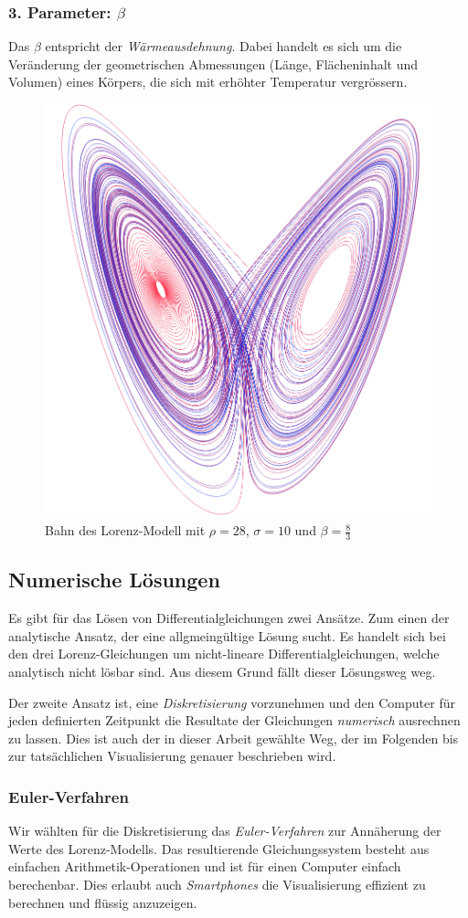\subsubsection{3. Parameter: $\beta$}
Das $ \beta $ entspricht der \textit{Wärmeausdehnung}. Dabei handelt es sich um die Veränderung der geometrischen Abmessungen (Länge, Flächeninhalt und Volumen) eines Körpers, die sich mit erhöhter Temperatur vergrössern.

\begin{figure}
	\centering
	\includegraphics[width=0.3\linewidth]{lorenz/assets/lorenz-modell/lorenz-modell}
	\caption{Bahn des Lorenz-Modell mit $\rho = 28$, $\sigma = 10$ und $\beta = \frac{8}{3}$}
	\label{fig:lorenz-modell}
\end{figure}


\subsection{Numerische Lösungen}
Es gibt für das Lösen von Differentialgleichungen zwei Ansätze. Zum einen der analytische Ansatz, der eine allgmeingültige Lösung sucht. Es handelt sich bei den drei Lorenz-Gleichungen um nicht-lineare Differentialgleichungen, welche analytisch nicht lösbar sind. Aus diesem Grund fällt dieser Lösungsweg weg. 

Der zweite Ansatz ist, eine \textit{Diskretisierung} vorzunehmen und den Computer für jeden definierten Zeitpunkt die Resultate der Gleichungen \textit{numerisch} ausrechnen zu lassen. Dies ist auch der in dieser Arbeit gewählte Weg, der im Folgenden bis zur tatsächlichen Visualisierung genauer beschrieben wird.

\subsubsection{Euler-Verfahren}

Wir wählten für die Diskretisierung das \textit{Euler-Verfahren} zur Annäherung der Werte des Lorenz-Modells. Das resultierende Gleichungssystem besteht aus einfachen Arithmetik-Operationen und ist für einen Computer einfach berechenbar. Dies erlaubt auch \textit{Smartphones} die Visualisierung effizient zu berechnen und flüssig anzuzeigen.

